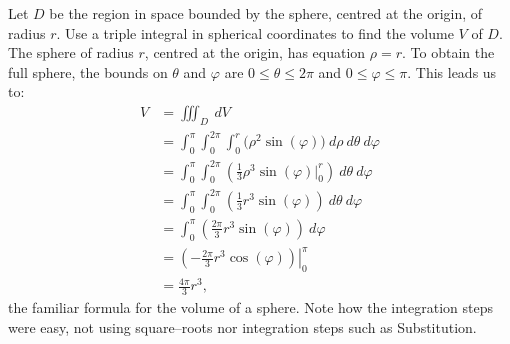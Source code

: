 {Let $D$ be the region in space bounded by the sphere, centred at the origin, of radius $r$. Use a triple integral in spherical coordinates to find the volume $V$ of $D$.
}
{The sphere of radius $r$, centred at the origin, has equation $\rho = r$. To obtain the full sphere, the bounds on $\theta$ and $\varphi$ are $0\leq \theta \leq 2\pi$ and $0 \leq \varphi \leq \pi$. This leads us to:
\begin{align*}
V &= \iiint_D\ dV\\
	&= \int_0^{\pi}\int_0^{2\pi}\int_0^r\big(\rho^2\sin(\varphi)\big)\ d\rho\ d\theta\ d\varphi\\
	&= \int_0^\pi\int_0^{2\pi}\left(\frac13\rho^3\sin(\varphi)\Big|_0^r\right)\ d\theta\ d\varphi\\
	&= \int_0^\pi\int_0^{2\pi} \left(\frac13r^3\sin(\varphi)\right)\ d\theta\ d\varphi\\
	&= \int_0^\pi \left(\frac{2\pi}3r^3\sin(\varphi)\right)\ d\varphi\\
	&= \left.\left(-\frac{2\pi}3r^3\cos(\varphi)\right)\right|_0^{\pi}\\
	&= \frac{4\pi}3r^3,
\end{align*}
the familiar formula for the volume of a sphere. Note how the integration steps were easy, not using square--roots nor integration steps such as Substitution.
}\\

